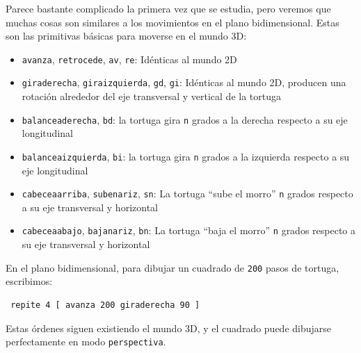 Parece bastante complicado la primera vez que se estudia, pero veremos que
muchas cosas son similares a los movimientos en el plano bidimensional. Estas
son las primitivas b\'asicas para moverse en el mundo 3D:
\begin{itemize}
   \item \texttt{avanza}, \texttt{retrocede}, \texttt{av}, \texttt{re}:
      Id\'enticas al mundo 2D
   \item \texttt{giraderecha}, \texttt{giraizquierda}, \texttt{gd}, \texttt{gi}:
      Id\'enticas al mundo 2D, producen una rotaci\'on alrededor del eje
      transversal y vertical de la tortuga
   \item \texttt{balanceaderecha}, \texttt{bd}:
      la tortuga gira \texttt{n} grados a la derecha respecto a su eje
      longitudinal 
   \item \texttt{balanceaizquierda}, \texttt{bi}:%
      la tortuga gira \texttt{n} grados a la izquierda respecto a su eje
      longitudinal 
   \item \texttt{cabeceaarriba}, \texttt{subenariz}, \texttt{sn}:%
       La tortuga ``sube el morro''
      \texttt{n} grados respecto a su eje transversal y horizontal
   \item \texttt{cabeceaabajo}, \texttt{bajanariz}, \texttt{bn}:%
       La tortuga ``baja el morro''
      \texttt{n} grados respecto a su eje transversal y horizontal
\end{itemize}

En el plano bidimensional, para dibujar un cuadrado de \texttt{200} pasos
de tortuga, escribimos:
\begin{verbatim}
 repite 4 [ avanza 200 giraderecha 90 ]\end{verbatim}
Estas \'ordenes siguen existiendo el mundo 3D, y el cuadrado puede
dibujarse perfectamente en modo \texttt{perspectiva}. 

